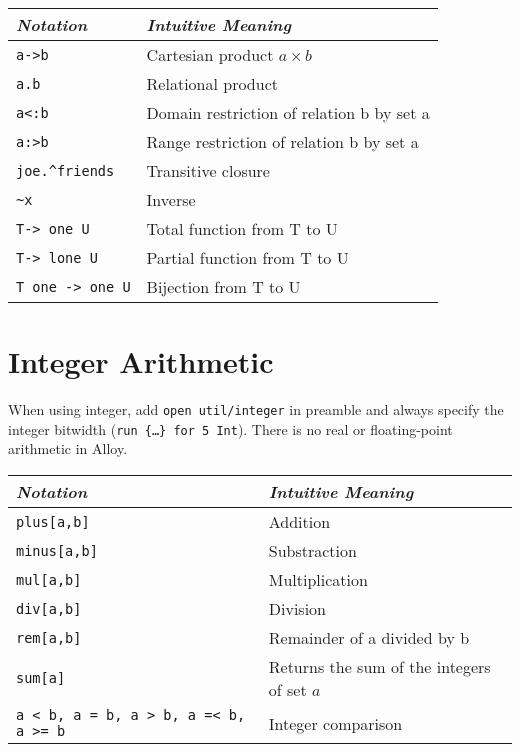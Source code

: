 \documentclass{article}
\newlength\tw
\begin{document}
\begin{longtable}{|p{\tw}|p{\tw}|}
\hline
\emph{Notation} & \emph{Intuitive Meaning} \\
\hline
\texttt{a->b} & Cartesian product $a \times b$ \\
\hline
\texttt{a.b} & Relational product\\
\hline
\texttt{a<:b} & Domain restriction of relation b by set a \\
\hline
\texttt{a:>b} & Range restriction of relation b by set a \\
\hline
\texttt{joe.\^{}friends} & Transitive closure\\
\hline
\texttt{\~{}x} & Inverse \\
\hline
\texttt{T-> one U} &  Total function from T to U\\
\hline
\texttt{T-> lone U} & Partial function from T to U\\
\hline
\texttt{T one -> one U} & Bijection from T to U\\
\hline
\end{longtable}

\section{Integer Arithmetic}

When using integer, add \texttt{open util/integer} in preamble and always specify the integer bitwidth (\texttt{run \{\ldots\} for 5 Int}). There is no real or floating-point arithmetic in Alloy.

\begin{longtable}{|p{\tw}|p{\tw}|}
\hline
\emph{Notation} & \emph{Intuitive Meaning} \\
\hline
\texttt{plus[a,b]} & Addition\\
\hline
\texttt{minus[a,b]} & Substraction\\
\hline
\texttt{mul[a,b]} & Multiplication\\
\hline
\texttt{div[a,b]} & Division\\
\hline
\texttt{rem[a,b]} & Remainder of a divided by b\\
\hline
\texttt{sum[a]} & Returns the sum of the integers of set $a$\\
\hline
\texttt{a < b, a = b, a > b, a =< b, a >= b} & Integer comparison\\
\hline
\end{longtable}
\end{document}
